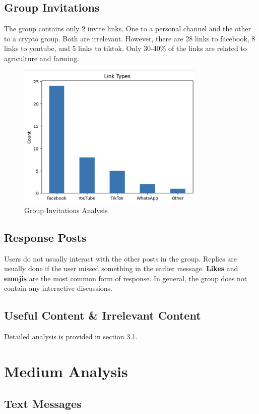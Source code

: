 \documentclass[12pt]{article}
\begin{document}
\subsection{Group Invitations}
The group contains only 2 invite links. One to a personal channel and the other to a crypto group. Both are irrelevant. However, there are 28 links to facebook, 8 links to youtube, and 5 links to tiktok. Only 30-40\% of the links are related to agriculture and farming.
\begin{figure}[H]
\centering
\includegraphics[width=0.8\textwidth]{img/group_invitations.png}
\caption{Group Invitations Analysis}
\end{figure}

\subsection{Response Posts}
Users do not usually interact with the other posts in the group. Replies are usually done if the user missed something in the earlier message.  \textbf{Likes} and \textbf{emojis} are the most common form of response. In general, the group does not contain any interactive discussions.



\subsection{Useful Content \& Irrelevant Content}
Detailed analysis is provided in section 3.1.

\section{Medium Analysis}
\subsection{Text Messages}
\end{document}
